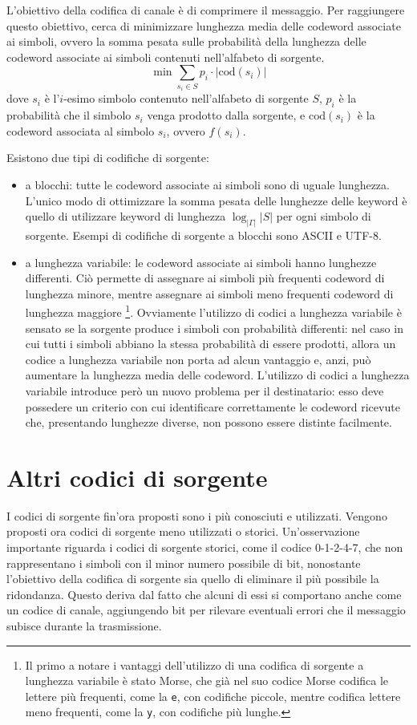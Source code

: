 L'obiettivo della codifica di canale è di comprimere il messaggio. Per
raggiungere questo obiettivo, cerca di minimizzare lunghezza media
delle codeword associate ai simboli, ovvero la somma pesata sulle
probabilità della lunghezza delle codeword associate ai simboli contenuti
nell'alfabeto di sorgente.
\[
    \min \sum_{s_i \in S} p_i \cdot |\text{cod}(s_i)|
\]
dove $s_i$ è l'$i$-esimo simbolo contenuto nell'alfabeto di sorgente $S$,
$p_i$ è la probabilità che il simbolo $s_i$ venga prodotto dalla sorgente,
e $\text{cod}(s_i)$ è la codeword associata al simbolo $s_i$, ovvero $f(s_i)$.

Esistono due tipi di codifiche di sorgente:
\begin{itemize}
    \item a blocchi: tutte le codeword associate ai simboli sono di uguale
    lunghezza. L'unico modo di ottimizzare la somma pesata delle lunghezze delle
    keyword è quello di utilizzare keyword di lunghezza $\log_{|\Gamma|}|S|$
    per ogni simbolo di sorgente.
    Esempi di codifiche di sorgente a blocchi sono ASCII e UTF-8.
    \item a lunghezza variabile: le codeword associate ai simboli hanno
    lunghezze differenti. Ciò permette di assegnare ai simboli più
    frequenti codeword di lunghezza minore, mentre assegnare ai simboli
    meno frequenti codeword di lunghezza maggiore \footnote{
    Il primo a notare i vantaggi dell'utilizzo di una codifica di sorgente
    a lunghezza variabile è stato Morse, che già nel suo codice Morse codifica
    le lettere più frequenti, come la \verb|e|, con codifiche piccole, mentre
    codifica lettere meno frequenti, come la \verb|y|, con codifiche più lunghe.}.
    Ovviamente l'utilizzo di codici a lunghezza variabile è sensato se la sorgente
    produce i simboli con probabilità differenti: nel caso in cui tutti
    i simboli abbiano la stessa probabilità di essere prodotti, allora
    un codice a lunghezza variabile non porta ad alcun vantaggio e, anzi,
    può aumentare la lunghezza media delle codeword.
    L'utilizzo di codici a lunghezza variabile introduce però un nuovo
    problema per il destinatario: esso deve possedere un criterio con cui
    identificare correttamente le codeword ricevute che, presentando
    lunghezze diverse, non possono essere distinte facilmente.
\end{itemize}

\section{Altri codici di sorgente}
I codici di sorgente fin'ora proposti sono i più conosciuti e utilizzati.
Vengono proposti ora codici di sorgente meno utilizzati o storici.
Un'osservazione importante riguarda i codici di sorgente storici,
come il codice 0-1-2-4-7, che non rappresentano i simboli con il minor numero
possibile di bit, nonostante l'obiettivo della codifica di sorgente sia
quello di eliminare il più possibile la ridondanza. Questo deriva dal fatto
che alcuni di essi si comportano anche come un codice di canale, aggiungendo
bit per rilevare eventuali errori che il messaggio subisce durante la trasmissione.

